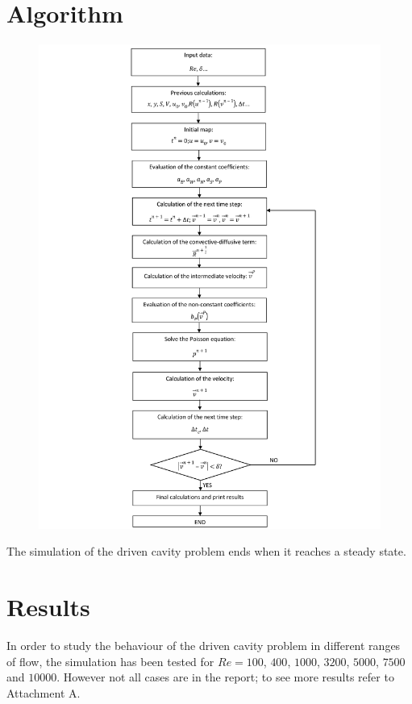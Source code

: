 \section{Algorithm}
\begin{figure}[H]
	\centering
	\includegraphics[scale=0.169]{DrivenCavity/algorithm}
\end{figure}
The simulation of the driven cavity problem ends when it reaches a steady state.

\section{Results}
In order to study the behaviour of the driven cavity problem in different ranges of flow, the simulation has been tested for $Re=100$, $400$, $1000$, $3200$, $5000$, $7500$ and $10000$. However not all cases are in the report; to see more results refer to Attachment A.

